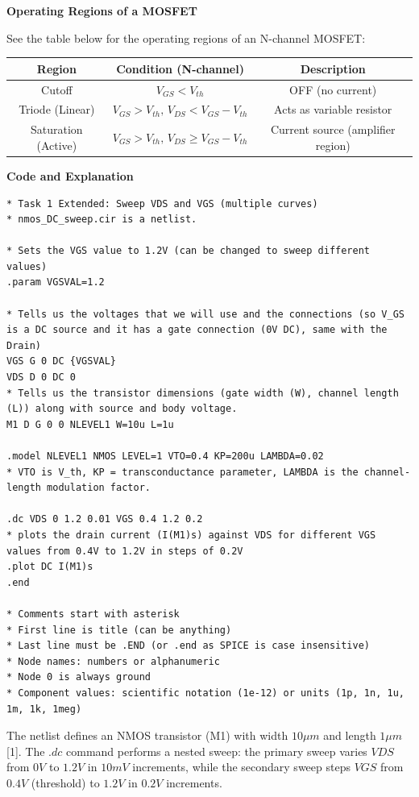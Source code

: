 \documentclass[a4paper,12pt]{article}
\begin{document}
\textbf{Operating Regions of a MOSFET}

See the table below for the operating regions of an N-channel MOSFET:

\begin{center}
\begin{tabular}{|c|c|c|}
\hline
\textbf{Region} & \textbf{Condition (N-channel)} & \textbf{Description} \\
\hline
Cutoff & $V_{GS} < V_{th}$ & OFF (no current) \\
Triode (Linear) & $V_{GS} > V_{th}, \, V_{DS} < V_{GS}-V_{th}$ & Acts as variable resistor \\
Saturation (Active) & $V_{GS} > V_{th}, \, V_{DS} \ge V_{GS}-V_{th}$ & Current source (amplifier region) \\
\hline
\end{tabular}
\end{center}

\textbf{Code and Explanation}

\begin{lstlisting}[caption=NMOS Sweep Simulation Code, label=lst:nmos_sweep]
* Task 1 Extended: Sweep VDS and VGS (multiple curves)
* nmos_DC_sweep.cir is a netlist.

* Sets the VGS value to 1.2V (can be changed to sweep different values)
.param VGSVAL=1.2 

* Tells us the voltages that we will use and the connections (so V_GS is a DC source and it has a gate connection (0V DC), same with the Drain)
VGS G 0 DC {VGSVAL}
VDS D 0 DC 0
* Tells us the transistor dimensions (gate width (W), channel length (L)) along with source and body voltage.
M1 D G 0 0 NLEVEL1 W=10u L=1u

.model NLEVEL1 NMOS LEVEL=1 VTO=0.4 KP=200u LAMBDA=0.02
* VTO is V_th, KP = transconductance parameter, LAMBDA is the channel-length modulation factor.

.dc VDS 0 1.2 0.01 VGS 0.4 1.2 0.2
* plots the drain current (I(M1)s) against VDS for different VGS values from 0.4V to 1.2V in steps of 0.2V
.plot DC I(M1)s 
.end

* Comments start with asterisk
* First line is title (can be anything)
* Last line must be .END (or .end as SPICE is case insensitive)
* Node names: numbers or alphanumeric
* Node 0 is always ground
* Component values: scientific notation (1e-12) or units (1p, 1n, 1u, 1m, 1k, 1meg)
\end{lstlisting}

The netlist defines an NMOS transistor (M1) with width $10\mu m$ and length $1\mu m$ [1]. 
The $.dc$ command performs a nested sweep: the primary sweep varies $VDS$ from $0V$ to $1.2V$ in $10mV$ increments, while the secondary sweep steps $VGS$ from $0.4V$ (threshold) to $1.2V$ in $0.2V$ increments. 
\end{document}
